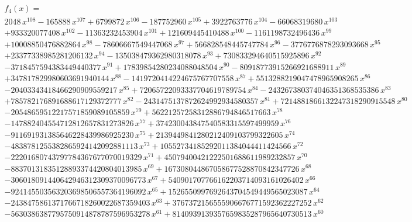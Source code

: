 \documentclass[a4paper,twoside]{article}
\begin{document}
\begin{tiny}
$$
\begin{array}{l}
\mbox{$\displaystyle{f_4(x)=}$}\\
2048\,{x}^{108}-165888\,{x}^{107}+6799872\,{x}^{106}-187752960\,{x}^{105}+3922763776\,{x}^{104}-66068319680\,{x}^{103}\\
+933320077408\,{x}^{102}-11363232453904\,{x}^{101}+121609445410488\,{x}^{100}-1161198732496436\,{x}^{99}\\
+10008850476882864\,{x}^{98}-78606667549447068\,{x}^{97}+566828548445747784\,{x}^{96}-3776776878293093668\,{x}^{95}\\
+23377338985281206132\,{x}^{94}-135038479362980318078\,{x}^{93}+730833294640515925896\,{x}^{92}\\
-3718457594383449440377\,{x}^{91}+17839854280234088048504\,{x}^{90}-80918773915266921688911\,{x}^{89}\\
+347817829980603691940144\,{x}^{88}-1419720414224675767707558\,{x}^{87}+5513288219047478965908265\,{x}^{86}\\
-20403343418466290909559217\,{x}^{85}+72065722093337704619789754\,{x}^{84}-243267380374046351368535386\,{x}^{83}\\
+785782176891688617129372777\,{x}^{82}-2431475137872624992934580357\,{x}^{81}+7214881866132247318290915548\,{x}^{80}\\
-20548659512217571859089105859\,{x}^{79}+56221257258312886794846517663\,{x}^{78}\\
-147882404554712812657831273826\,{x}^{77}+374230043847540583315597499959\,{x}^{76}\\
-911691931385646228439986925230\,{x}^{75}+2139449841280212409103799322605\,{x}^{74}\\
-4838781255382865924142092881113\,{x}^{73}+10552734185292011384044411424566\,{x}^{72}\\
-22201680743797784367677070019329\,{x}^{71}+45079400421222501688611989232857\,{x}^{70}\\
-88370131835128893374420804013985\,{x}^{69}+167308044867058677528870842347726\,{x}^{68}\\
-306018091440642946312309370096773\,{x}^{67}+540901707766162203714093161026402\,{x}^{66}\\
-924145503563203698506557364196092\,{x}^{65}+1526550997692643704549449565023087\,{x}^{64}\\
-2438475861371766718260022687359403\,{x}^{63}+3767372156555906676771592362227252\,{x}^{62}\\
-5630386387795750914878787596953278\,{x}^{61}+8140939139357659835287965640730513\,{x}^{60}\\

\end{array}$$
\end{tiny}
\end{document}
